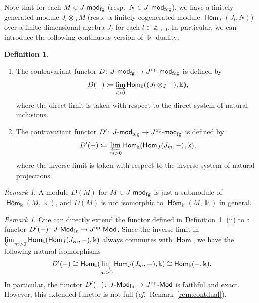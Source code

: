 \documentclass[12pt]{amsart}
\theoremstyle{definition}
\newtheorem{definition}[theorem]{Definition}
\theoremstyle{remark}
\newtheorem{remark}[theorem]{Remark}
\numberwithin{equation}{section}
\newcommand{\opname}[1]{\operatorname{\mathsf{#1}}}
\newcommand{\Hom}{\opname{Hom}}
\newcommand{\confer}{\textit{cf.}\ }
\newcommand{\modfg}{\mathchar`-\mathsf{mod}_{\mathrm{fg}}}
\newcommand{\modfcg}{\mathchar`-\mathsf{mod}_{\mathrm{fcg}}}
\newcommand{\op}{\mathrm{op}}
\newcommand{\Modln}{\mathchar`-\mathsf{Mod}_{\mathrm{ln}}}
\newcommand{\Mod}{\mathchar`-\mathsf{Mod}}
\begin{document}
Note that for each $M\in J\modfg$ (resp.\ $N\in J\modfcg$), we have a finitely generated module $J_l\otimes_J M$ (resp.\ a finitely cogenerated module $\Hom_J(J_l, N)$) over a finite-dimensional algebra $J_l$ for each $l\in \mathbb{Z}_{>0}$.
In particular, we can introduce the following continuous version of $\Bbbk $-duality:


\begin{definition}\label{def:Cdual}
    \begin{enumerate}
        \item[(i)] The contravariant functor $D\colon J\modfg\to J^\op\modfcg$ is defined by
        \[D(-)\coloneqq \varinjlim_{l>0}\Hom_{\Bbbk }((J_l\otimes_J -), \Bbbk ),\] where the direct limit is taken with respect to the direct system of natural inclusions.
        \item[(ii)] The contravariant functor $D'\colon J\modfcg \to J^\op\modfg$ is defined by \[D'(-)\coloneqq \varprojlim_{m>0}\Hom_{\Bbbk }(\Hom_{J}(J_m, -), \Bbbk ),\] where the inverse limit is taken with respect to the inverse system of natural projections.
    \end{enumerate}
     
\end{definition}
\begin{remark}
A module $D(M)$ for $M\in J\modfg$ is just a submodule of $\Hom_{\Bbbk }(M, \Bbbk )$, and $D(M)$ is not isomorphic to $\Hom_{\Bbbk }(M, \Bbbk )$ in general.
\end{remark}
\begin{remark}\label{rem:dual}
    One can directly extend the functor defined in Definition~\ref{def:Cdual}~(ii) to a functor $D'(-)\colon J\Modln \to J^\op\Mod$. Since
    the inverse limit in $\varprojlim_{m>0}\Hom_{\Bbbk }(\Hom_{J}(J_m, -), \Bbbk )$ always commutes with $\Hom$,  we have the following natural isomorphisms
\[D'(-)\cong \Hom_{\Bbbk }(\varinjlim_{m>0}\Hom_{J}(J_m, -), \Bbbk )\cong \Hom_{\Bbbk }(-, \Bbbk ).\]
In particular, the functor $D'(-)\colon J\Modln \to J^\op\Mod$ is faithful and exact. However, this extended functor is not full (\confer Remark~\ref{rem:contdual}).
\end{remark}
\end{document}
